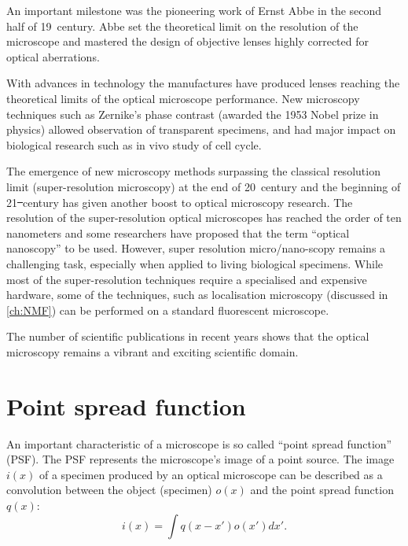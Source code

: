 An important milestone was the pioneering work of Ernst Abbe \cite{Abbe1873} in the second half of 19\ths\ century. Abbe set the theoretical limit on the resolution of the microscope and mastered the design of objective lenses highly corrected for optical aberrations.

With advances in technology the manufactures have produced lenses reaching the theoretical limits of the optical microscope performance. New microscopy techniques such as Zernike's phase contrast \cite{Zernike1942} (awarded the 1953 Nobel prize in physics) allowed observation of transparent specimens, and had major impact on biological research such as in vivo study of cell cycle. 

The emergence of new microscopy methods surpassing the classical resolution limit (super-resolution microscopy) at the end of 20\ths\ century and the beginning of 21\st\ century has given another boost to optical microscopy research. The resolution of the super-resolution optical microscopes has reached the order of ten nanometers and some researchers have proposed that the term ``optical nanoscopy'' to be used. However, super resolution micro/nano-scopy remains a challenging task, especially when applied to living biological specimens. While most of the super-resolution techniques require a specialised and expensive hardware, some of the techniques, such as localisation microscopy (discussed in \autoref{ch:NMF}) can be performed on a standard fluorescent microscope. 

The number of scientific publications in recent years shows that the optical microscopy remains a vibrant and exciting scientific domain.


\section{Point spread function}

An important characteristic of a microscope is so called ``point spread function'' (PSF). The PSF represents the microscope's image of a point source. The image $i(x)$ of a specimen produced by an optical microscope can be described as a convolution between the object (specimen) $o(x)$ and the point spread function $q(x)$:
%
\begin{equation}
	i(x)=\int q(x-x')o(x')dx'.
	\label{eq:conv}
\end{equation}  

